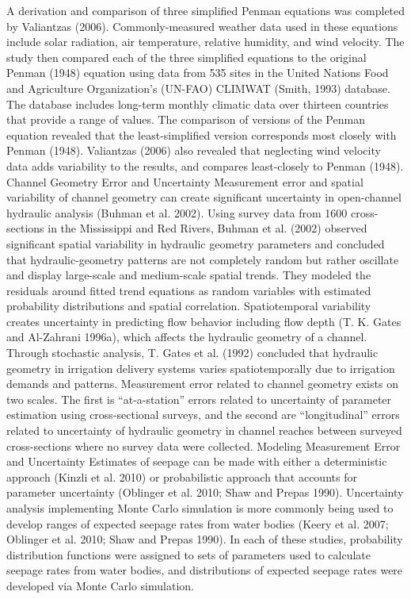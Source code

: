 \begin{linenumbers}
A derivation and comparison of three simplified Penman equations was completed by Valiantzas (2006).  Commonly-measured weather data used in these equations include solar radiation, air temperature, relative humidity, and wind velocity.  The study then compared each of the three simplified equations to the original Penman (1948) equation using data from 535 sites in the United Nations Food and Agriculture Organization's (UN-FAO) CLIMWAT (Smith, 1993) database.  The database includes long-term monthly climatic data over thirteen countries that provide a range of values.  The comparison of versions of the Penman equation revealed that the least-simplified version corresponds most closely with Penman (1948).  Valiantzas (2006) also revealed that neglecting wind velocity data adds variability to the results, and compares least-closely to Penman (1948).
Channel Geometry Error and Uncertainty
Measurement error and spatial variability of channel geometry can create significant uncertainty in open-channel hydraulic analysis (Buhman et al. 2002).  Using survey data from 1600 cross-sections in the Mississippi and Red Rivers, Buhman et al. (2002) observed significant spatial variability in hydraulic geometry parameters and concluded that hydraulic-geometry patterns are not completely random but rather oscillate and display large-scale and medium-scale spatial trends.  They modeled the residuals around fitted trend equations as random variables with estimated probability distributions and spatial correlation.
Spatiotemporal variability creates uncertainty in predicting flow behavior including flow depth (T. K. Gates and Al-Zahrani 1996a), which affects the hydraulic geometry of a channel.  Through stochastic analysis, T. Gates et al. (1992) concluded that hydraulic geometry in irrigation delivery systems varies spatiotemporally due to irrigation demands and patterns.
Measurement error related to channel geometry exists on two scales.  The first is “at-a-station” errors related to uncertainty of parameter estimation using cross-sectional surveys, and the second are “longitudinal” errors related to uncertainty of hydraulic geometry in channel reaches between surveyed cross-sections where no survey data were collected.
Modeling Measurement Error and Uncertainty
Estimates of seepage can be made with either a deterministic approach (Kinzli et al. 2010) or probabilistic approach that accounts for parameter uncertainty (Oblinger et al. 2010; Shaw and Prepas 1990).  Uncertainty analysis implementing Monte Carlo simulation is more commonly being used to develop ranges of expected seepage rates from water bodies (Keery et al. 2007; Oblinger et al. 2010; Shaw and Prepas 1990).  In each of these studies, probability distribution functions were assigned to sets of parameters used to calculate seepage rates from water bodies, and distributions of expected seepage rates were developed via Monte Carlo simulation.  

\end{linenumbers}
